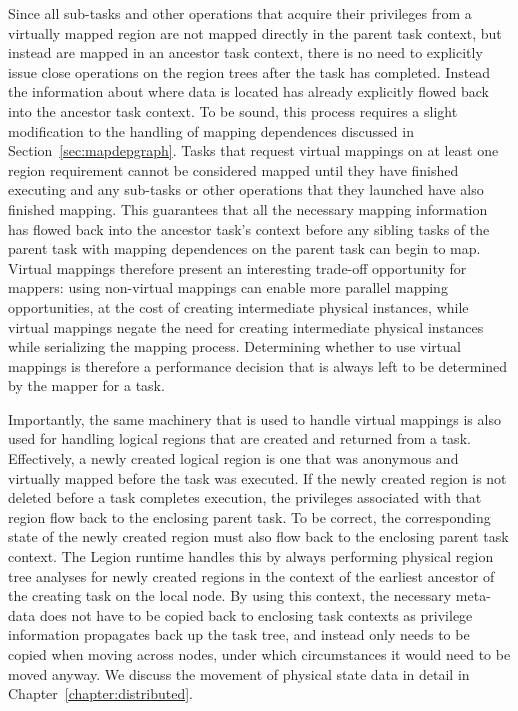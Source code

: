 Since all sub-tasks and other operations that acquire
their privileges from a virtually mapped region are not 
mapped directly in the parent task context, but instead 
are mapped in an ancestor task context, there is no need
to explicitly issue close operations on the region trees
after the task has completed. Instead the information
about where data is located has already explicitly flowed
back into the ancestor task context. To be sound, this
process requires a slight modification to the handling
of mapping dependences discussed in 
Section~\ref{sec:mapdepgraph}. Tasks that request
virtual mappings on at least one region requirement
cannot be considered mapped until they have finished executing
and any sub-tasks or other operations that they launched
have also finished mapping. This guarantees that all the
necessary mapping information has flowed back into the
ancestor task's context before any sibling tasks of the
parent task with mapping dependences on the parent task 
can begin to map. Virtual mappings therefore present an 
interesting trade-off opportunity for mappers: using 
non-virtual mappings can enable more parallel mapping 
opportunities, at the cost of creating intermediate physical 
instances, while virtual mappings negate the need for 
creating intermediate physical instances while serializing 
the mapping process. Determining whether to use virtual 
mappings is therefore a performance decision that is always
left to be determined by the mapper for a task.

Importantly, the same machinery that is used to handle virtual 
mappings is also used for handling logical regions that are 
created and returned from a task. Effectively, a newly
created logical region is one that was anonymous and virtually
mapped before the task was executed.  If the newly created
region is not deleted before a task completes execution,
the privileges associated with that region flow back to
the enclosing parent task. To be correct, the corresponding
state of the newly created region must also flow back to
the enclosing parent task context. The Legion runtime handles
this by always performing physical region tree analyses for
newly created regions in the context of the earliest ancestor
of the creating task on the local node. By using this context,
the necessary meta-data does not have to be copied back to 
enclosing task contexts as privilege information propagates
back up the task tree, and instead only needs to be copied
when moving across nodes, under which circumstances it would
need to be moved anyway.  We discuss the movement of physical
state data in detail in Chapter~\ref{chapter:distributed}.

